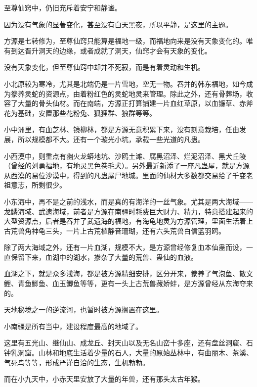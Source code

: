 
\begin{this_body}



至尊仙窍中，仍旧充斥着安宁和静谧。

因为没有气象的显著变化，甚至没有白天黑夜，所以平静，是这里的主题。

方源是七转修为，至尊仙窍只能算是福地一级，而福地向来是没有天象变化的。唯有到达晋升洞天的边缘，或者成就了洞天，仙窍才会有天象的变化。

没有天象变化，但至尊仙窍中却并不死寂，而是有着灵动和生机。

小北原较为寒冷，尤其是北端仍是一片雪地，空无一物。吞并的韩东福地，如今成为豢养灵蛇的资源点，由着粉红色的灵蛇地灵来管理。除此之外，还有骨葬场，收容了大量的骨头仙材。而在南端，方源正打算铺建一片血红草原，以血镰草、赤斧花为基础，安置那些花粉兔、狐狸群、狼群等等。

小中洲里，有血芝林、镜柳林，都是方源无意积累下来，没有刻意栽培，任由发展，所以规模都不大。还有一个璇光小坑，承载一些光道的凡蛊。

小西漠中，则重点有幽火龙蟒地坑、沙鸥土滩、腐黑沼泽、烂泥沼泽、黑犬丘陵（曾经的刘勇福地，有地灵黑色卷毛犬）。另外最近新添了一座凡蛊屋，就是方源从西漠的易位沙漠中，得到的凡蛊屋尸地城。里面的仙材大多数都交易给了千变老祖意志，所剩很少。

小东海中，再不是之前的浅水，而是真的有海洋的一丝气象。尤其是两大海域——龙鳞海域、武遗海域，前者是方源在南疆时耗费巨大财力、精力，特意搭建起来的大型资源点，后者是吞并了武遗海的福地，有海龟地灵为方源管理，里面生活着上古荒兽角神龟三头，一片上古荒植静音珊瑚，还有六头荒兽白信蓝羽鸥。

除了两大海域之外，还有一片血湖，规模不大，是方源曾经修复血本仙蛊而设，一直保留下来，血湖中的湖水，掺杂了大量的荒兽、蛊仙的血液。

血湖之下，就是众多浅海，都是被方源精细安排，区分开来，豢养了气泡鱼、散文鲤、青鱼鲫鱼、血玉鲫鱼等等，更有一头上古荒兽藏娇蚌，是方源曾经从东海夺来的。

天地秘境之一的逆流河，也暂时被方源搁置在这里。

小南疆是所有当中，建设程度最高的地域了。

这里有五光山、继仙山、成龙丘、封天山以及无名山峦十多座，还有盘丝洞窟、石钟乳洞窟。山林和地底生活着少量的石人，大量的原始丛林中，有曲丽木、茶溪、气死鸟等等，形成严谨自洽的生态，生机勃勃。

而在小九天中，小赤天里安放了大量的年兽，还有那头太古年猴。


\end{this_body}
